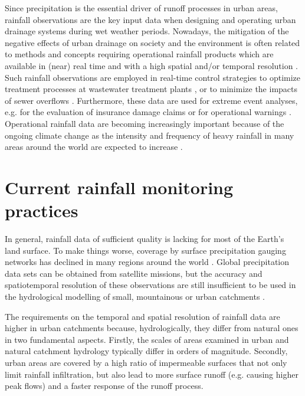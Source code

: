\documentclass{ctuthesis}\usepackage[]{graphicx}\usepackage[]{color}
\begin{document}
Since precipitation is the essential driver of runoff processes in urban areas, rainfall observations are the key input data when designing and operating urban drainage systems during wet weather periods. Nowadays, the mitigation of the negative effects of urban drainage on society and the environment is often related to methods and concepts requiring operational rainfall products which are available in (near) real time and with a high spatial and/or temporal resolution \citep{einfaltRoadmapUseRadar2004}. Such rainfall observations are employed in real-time control strategies to optimize treatment processes at wastewater treatment plants \citep{schutzeRealTimeControl2004}, or to minimize the impacts of sewer overflows \citep{vezzaroGeneralisedDynamicOverflow2014}. Furthermore, these data are used for extreme event analyses, e.g. for the evaluation of insurance damage claims \citep{spekkersStatisticalAnalysisInsurance2013} or for operational warnings \citep{montesarchioRainfallThresholdsFlood2009}. Operational rainfall data are becoming increasingly important because of the ongoing climate change \citep{vanderpolImpactsRainfallVariability2015} as the intensity and frequency of heavy rainfall in many areas around the world are expected to increase \citep{willemsClimateChangeImpact2012}.


\section{Current rainfall monitoring practices}

In general, rainfall data of sufficient quality is lacking for most of the Earth’s land surface. To make things worse, coverage by surface precipitation gauging networks has declined in many regions around the world \citep{lorenzHydrologicalCycleThree2012}. Global precipitation data sets can be obtained from satellite missions, but the accuracy and spatiotemporal resolution of these observations are still insufficient to be used in the hydrological modelling of small, mountainous or urban catchments \citep{kiddGlobalPrecipitationMeasurement2011}.

The requirements on the temporal and spatial resolution of rainfall data are higher in urban catchments \citep[e.g.][]{schilling1991rainfall, berneTemporalSpatialResolution2004} because, hydrologically, they differ from natural ones in two fundamental aspects. Firstly, the scales of areas examined in urban and natural catchment hydrology typically differ in orders of magnitude. Secondly, urban areas are covered by a high ratio of impermeable surfaces that not only limit rainfall infiltration, but also lead to more surface runoff (e.g. causing higher peak flows) and a faster response of the runoff process.
\end{document}
